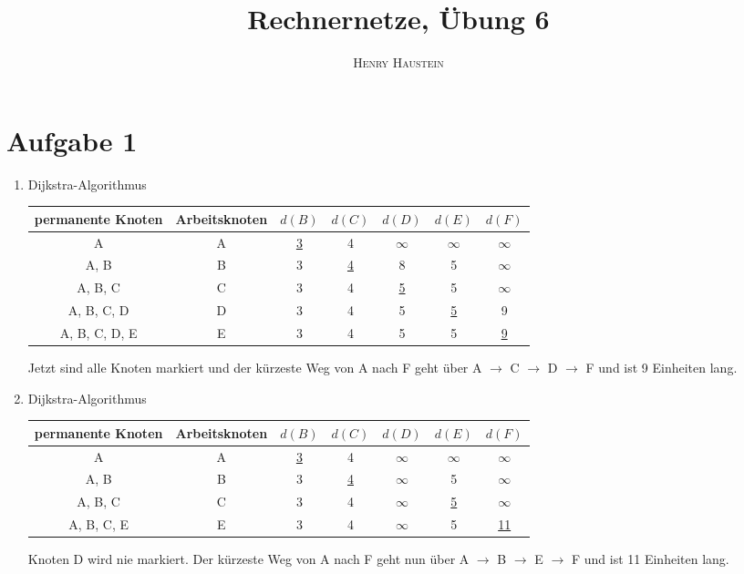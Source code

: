 \documentclass{article}
\title{\textbf{Rechnernetze, Übung 6}}
\author{\textsc{Henry Haustein}}
\date{}
\begin{document}
	\maketitle
	
	\section*{Aufgabe 1}
	\begin{enumerate}[label=(\alph*)]
		\item Dijkstra-Algorithmus
		\begin{center}
			\begin{tabular}{c|c|ccccc}
				\textbf{permanente Knoten} & \textbf{Arbeitsknoten} & $d(B)$ & $d(C)$ & $d(D)$ & $d(E)$ & $d(F)$ \\
				\hline
				A & A & \underline{3} & 4 & $\infty$ & $\infty$ & $\infty$ \\
				A, B & B & 3 & \underline{4} & 8 & 5 & $\infty$ \\
				A, B, C & C & 3 & 4 & \underline{5} & 5 & $\infty$ \\
				A, B, C, D & D & 3 & 4 & 5 & \underline{5} & 9 \\
				A, B, C, D, E & E & 3 & 4 & 5 & 5 & \underline{9}
			\end{tabular}
		\end{center}
		Jetzt sind alle Knoten markiert und der kürzeste Weg von A nach F geht über A $\to$ C $\to$ D $\to$ F und ist 9 Einheiten lang.
		\item Dijkstra-Algorithmus
		\begin{center}
			\begin{tabular}{c|c|ccccc}
				\textbf{permanente Knoten} & \textbf{Arbeitsknoten} & $d(B)$ & $d(C)$ & $d(D)$ & $d(E)$ & $d(F)$ \\
				\hline
				A & A & \underline{3} & 4 & $\infty$ & $\infty$ & $\infty$ \\
				A, B & B & 3 & \underline{4} & $\infty$ & 5 & $\infty$ \\
				A, B, C & C & 3 & 4 & $\infty$ & \underline{5} & $\infty$ \\
				A, B, C, E & E & 3 & 4 & $\infty$ & 5 & \underline{11} \\
			\end{tabular}
		\end{center}
		Knoten D wird nie markiert. Der kürzeste Weg von A nach F geht nun über A $\to$ B $\to$ E $\to$ F und ist 11 Einheiten lang.
	\end{enumerate}
\end{document}
